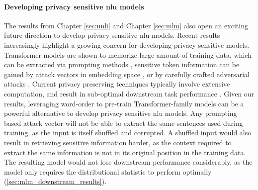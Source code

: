 \documentclass[letterpaper, 12pt]{report}
\begin{document}
\paragraph{Developing privacy sensitive \acrshort{nlu} models}
The results from Chapter \autoref{sec:unli} and Chapter \autoref{sec:mlm} also open an exciting future direction to develop privacy sensitive \acrshort{nlu} models. Recent results increasingly highlight a growing concern for developing privacy sensitive models. Transformer models are shown to memorize large amount of training data, which can be extracted via prompting methods \citep{carlini2021, carlini2022a}, sensitive token information can be gained by attack vectors in embedding space \citep{song2020information}, or by carefully crafted adversarial attacks \citep{henderson2018ethical}. Current privacy preserving techniques typically involve extensive computation, and result in sub-optimal downstream task performance \citep{jayaraman2019evaluating}. Given our results, leveraging word-order to pre-train Transformer-family models can be a powerful alternative to develop privacy sensitive \acrshort{nlu} models. Any prompting based attack vector will not be able to extract the same sentences used during training, as the input is itself shuffled and corrupted. A shuffled input would also result in retrieving sensitive information harder, as the context required to extract the same information is not in its original position in the training data. The resulting model would not lose downstream performance considerably, as the model only requires the distributional statistic to perform optimally (\autoref{sec:mlm_downstream_results}).

\clearpage


% 



\printglossaries


\end{document}
